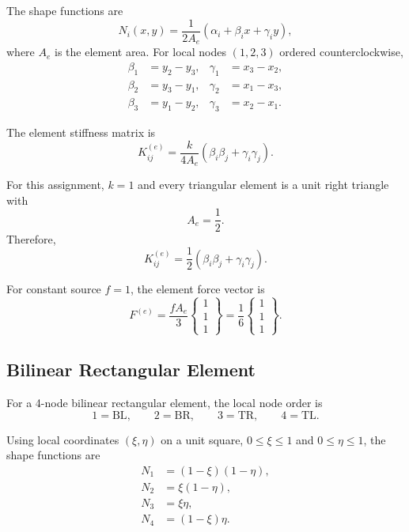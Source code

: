 \documentclass[14pt,a4paper]{article}
\newcommand{\vect}[1]{\begin{Bmatrix}#1\end{Bmatrix}}
\begin{document}
The shape functions are
\begin{equation}
    N_i(x,y)=\frac{1}{2A_e}\left(\alpha_i+\beta_i x+\gamma_i y\right),
\end{equation}
where $A_e$ is the element area. For local nodes $(1,2,3)$ ordered counterclockwise,
\begin{align}
    \beta_1 &= y_2-y_3, & \gamma_1 &= x_3-x_2,\\
    \beta_2 &= y_3-y_1, & \gamma_2 &= x_1-x_3,\\
    \beta_3 &= y_1-y_2, & \gamma_3 &= x_2-x_1.
\end{align}

The element stiffness matrix is
\begin{equation}
    K_{ij}^{(e)}=\frac{k}{4A_e}\left(\beta_i\beta_j+\gamma_i\gamma_j\right).
\end{equation}

For this assignment, $k=1$ and every triangular element is a unit right triangle with
\begin{equation}
    A_e=\frac{1}{2}.
\end{equation}
Therefore,
\begin{equation}
    K_{ij}^{(e)}=\frac{1}{2}\left(\beta_i\beta_j+\gamma_i\gamma_j\right).
\end{equation}

For constant source $f=1$, the element force vector is
\begin{equation}
    F^{(e)}=\frac{fA_e}{3}\vect{1\\1\\1}
    =
    \frac{1}{6}\vect{1\\1\\1}.
\end{equation}

\subsection{Bilinear Rectangular Element}

For a 4-node bilinear rectangular element, the local node order is
\begin{equation}
    1=\text{BL}, \qquad 2=\text{BR}, \qquad 3=\text{TR}, \qquad 4=\text{TL}.
\end{equation}

Using local coordinates $(\xi,\eta)$ on a unit square, $0\leq \xi\leq 1$ and $0\leq \eta\leq 1$, the shape functions are
\begin{align}
    N_1 &= (1-\xi)(1-\eta),\\
    N_2 &= \xi(1-\eta),\\
    N_3 &= \xi\eta,\\
    N_4 &= (1-\xi)\eta.
\end{align}
\end{document}
